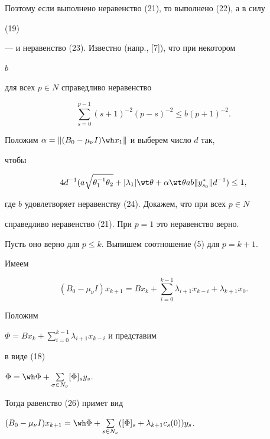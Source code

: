 \begin{pf}
Поэтому если выполнено неравенство (21), то выполнено (22), а в силу 


(19) 


--- и неравенство (23). Известно (напр., [7]), что при некотором 


$b$ 


для всех $p\in N$ справедливо неравенство 


\begin{equation} 


\sum^{p-1}_{s=0}(s+1)^{-2}(p-s)^{-2}\le b(p+1)^{-2}. 


\end{equation} 


 


Положим $\alpha=\|(B_0-\mu_\nu I)\wh x_1\|$ и выберем число $d$ так, 


чтобы 


\begin{equation} 


4d^{-1}(a\sqrt{\theta^{-1}_1\theta_2}+|\lambda_1|\wt\theta+ 


\alpha\wt\theta a b\|y^*_{s_0}\|d^{-1})\le 1, 


\end{equation} 


где $b$ удовлетворяет неравенству (24). Докажем, что при всех $p\in N$ 


справедливо неравенство (21). При $p=1$ это неравенство верно. 


Пусть оно верно для $p\le k$. Выпишем соотношение (5) для $p=k+1$. 


Имеем 


\begin{equation} 


(B_0-\mu_\nu I)x_{k+1}=B x_k+\sum^{k-1}_{i=0} 


\lambda_{i+1}x_{k-i}+\lambda_{k+1}x_0. 


\end{equation} 


Положим 


$\Phi=B x_k+\sum\limits^{k-1}_{i=0}\lambda_{i+1}x_{k-i}$ и представим 


в виде (18) 


$\Phi=\wh\Phi+\sum\limits_{\sigma\in N_\nu}[\Phi]_s y_s$. 


Тогда равенство (26) примет вид 


$(B_0-\mu_\nu I)x_{k+1}=\wh\Phi+\sum\limits_{s\in N_\nu} 


([\Phi]_s+\lambda_{k+1}c_s(0))y_s$. 



\end{pf}
